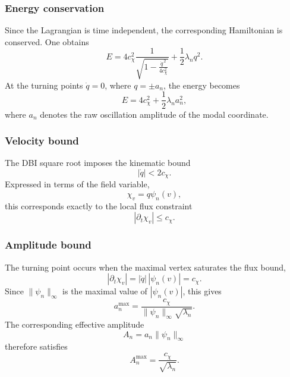 \documentclass[11pt,a4paper]{article}
\begin{document}
    \subsubsection*{Energy conservation}

      Since the Lagrangian is time independent, the corresponding Hamiltonian
      is conserved.
      One obtains
      \begin{equation}
        E
        =
        4c_\chi^2
        \frac{1}{\sqrt{1-\frac{\dot q^{\,2}}{4c_\chi^2}}}
        +
        \frac12\lambda_n q^2 .
      \end{equation}
      At the turning points $\dot q=0$, where $q=\pm a_n$, the energy becomes
      \begin{equation}
        E
        =
        4c_\chi^2
        +
        \frac12\lambda_n a_n^2 ,
      \end{equation}
      where $a_n$ denotes the raw oscillation amplitude of the modal coordinate.

    \subsubsection*{Velocity bound}

      The DBI square root imposes the kinematic bound
      \begin{equation}
        |\dot q| < 2c_\chi .
      \end{equation}
      Expressed in terms of the field variable,
      \[
        \chi_v = q\psi_n(v),
      \]
      this corresponds exactly to the local flux constraint
      \[
        |\partial_t \chi_v| \le c_\chi .
      \]

    \subsubsection*{Amplitude bound}

      The turning point occurs when the maximal vertex saturates the flux bound,
      \[
        |\partial_t\chi_v|
        =
        |\dot q|\,|\psi_n(v)|
        =
        c_\chi .
      \]
      Since $\|\psi_n\|_\infty$ is the maximal value of $|\psi_n(v)|$, this gives
      \begin{equation}
        a_n^{\max}
        =
        \frac{c_\chi}{\|\psi_n\|_\infty\sqrt{\lambda_n}} .
      \end{equation}
      The corresponding effective amplitude
      \[
        A_n = a_n\|\psi_n\|_\infty
      \]
      therefore satisfies
      \begin{equation}
        A_n^{\max}
        =
        \frac{c_\chi}{\sqrt{\lambda_n}} .
      \end{equation}
\end{document}
